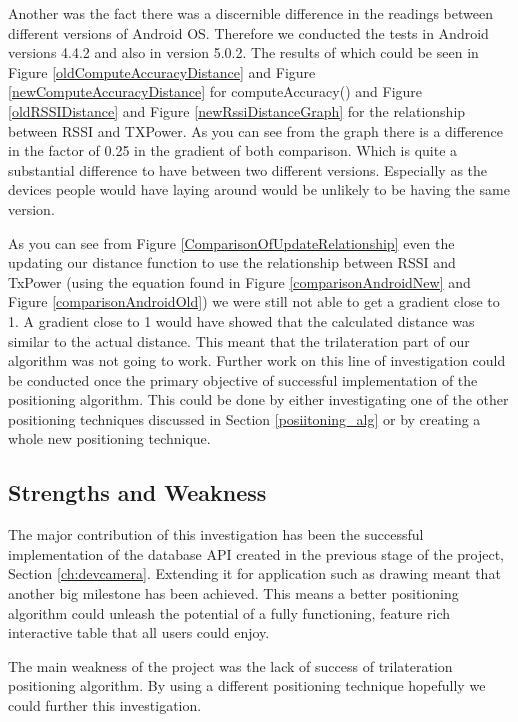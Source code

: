Another was the fact there was a discernible difference in the readings between different versions of Android OS. Therefore we conducted the tests in Android versions 4.4.2 and also in version 5.0.2. The results of which could be seen in Figure \ref{oldComputeAccuracyDistance} and Figure \ref{newComputeAccuracyDistance} for computeAccuracy() and Figure \ref{oldRSSIDistance} and Figure \ref{newRssiDistanceGraph} for the relationship between RSSI and TXPower. As you can see from the graph there is a difference in the factor of 0.25 in the gradient of both comparison. Which is quite a substantial difference to have between two different versions. Especially as the devices people would have laying around would be unlikely to be having the same version.

As you can see from Figure \ref{ComparisonOfUpdateRelationship} even the updating our distance function to use the relationship between RSSI and TxPower (using the equation found in Figure \ref{comparisonAndroidNew} and Figure \ref{comparisonAndroidOld}) we were still not able to get a gradient close to 1. A gradient close to 1 would have showed that the calculated distance was similar to the actual distance. This meant that the trilateration part of our algorithm was not going to work. Further work on this line of investigation could be conducted once the primary objective of successful implementation of the positioning algorithm. This could be done by either investigating one of the other positioning techniques discussed in Section \ref{posiitoning_alg} or by creating a whole new positioning technique.


\subsection{Strengths and Weakness}
The major contribution of this investigation has been the successful implementation of the database API created in the previous stage of the project, Section \ref{ch:devcamera}. Extending it for application such as drawing meant that another big milestone has been achieved. This means a better positioning algorithm could unleash the potential of a fully functioning, feature rich interactive table that all users could enjoy.

The main weakness of the project was the lack of success of trilateration positioning algorithm. By using a different positioning technique hopefully we could further this investigation.